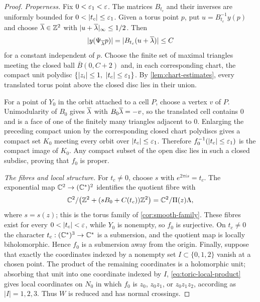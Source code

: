 \begin{proof}
\smallskip
\noindent\emph{Properness.}
Fix $0<\varepsilon_1<\varepsilon$.  The matrices $B_{t_c}$ and their inverses are
uniformly bounded for $0<|t_c|\leq\eps_1$.  Given a torus point $p$,
put $u=B_{t_c}^{-1}y(p)$ and choose $\overline\lambda\in\mathbb Z^2$ with
$|u+\overline\lambda|_\infty\leq1/2$.  Then
\[
 |y(\Psi_{\overline\lambda}p)|
 =|B_{t_c}(u+\overline\lambda)|
 \leq C
\]
for a constant independent of $p$.  Choose the finite set of maximal
triangles meeting the closed ball $\overline{B}(0,C+2)$ and, in each
corresponding chart, the compact unit polydisc
$\{|z_i|\leq1,\ |t_c|\leq\varepsilon_1\}$.  By
\cref{lem:chart-estimates}, every translated torus point above the closed
disc lies in their union.

For a point of $Y_0$ in the orbit attached to a cell $P$, choose a vertex
$v$ of $P$.  Unimodularity of $B_0$ gives $\overline\lambda$ with
$B_0\overline\lambda=-v$, so the translated cell contains $0$ and is a face
of one of the finitely many triangles adjacent to $0$.  Enlarging the
preceding compact union by the corresponding closed chart polydiscs gives
a compact set $K_0$ meeting every orbit over $|t_c|\leq\varepsilon_1$.
Therefore
$f_0^{-1}(|t_c|\leq\varepsilon_1)$ is the compact image of $K_0$.  Any compact
subset of the open disc lies in such a closed subdisc, proving that $f_0$
is proper.

\smallskip
\noindent\emph{The fibres and local structure.}
For $t_c\ne0$, choose $s$ with $e^{2\pi is}=t_c$.  The exponential map
$\mathbb C^2\to(\mathbb C^*)^2$ identifies the quotient fibre with
\[
 \mathbb C^2/\bigl(\mathbb Z^2+(sB_0+C(t_c))\mathbb Z^2\bigr)
 =\mathbb C^2/\Pi(z)\Lambda,
\]
where $s=s(z)$; this is the torus family of
\cref{cor:smooth-family}.  These fibres exist
for every $0<|t_c|<\eps$, while $Y_0$ is nonempty, so $f_0$ is
surjective.  On $t_c\ne0$ the character $t_c:(\mathbb C^*)^3\to\mathbb C^*$ is a
submersion, and the quotient map is locally biholomorphic.  Hence $f_0$
is a submersion away from the origin.  Finally, suppose that exactly the coordinates indexed by a nonempty set
$I\subset\{0,1,2\}$ vanish at a chosen point.  The product of the remaining
coordinates is a holomorphic unit; absorbing that unit into one coordinate
indexed by $I$, \eqref{eq:toric-local-product} gives local coordinates on
$N_0$ in which $f_0$ is $z_0$, $z_0z_1$, or $z_0z_1z_2$, according as
$|I|=1,2,3$.  Thus $W$ is reduced and has normal crossings.


\end{proof}
